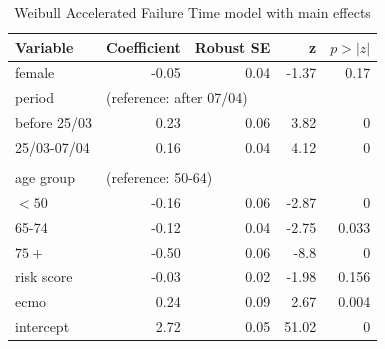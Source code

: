 \documentclass[review]{elsarticle}
\begin{document}
\begin{table}[htbp]
\caption{Weibull Accelerated Failure Time model with main effects \label{Table:main_model_weibull} }
\centering
\begin{tabular}{lrrrr}\toprule
Variable	&	Coefficient	&	Robust SE	&	z	&	$p>|z|$	\\\midrule
     female	&	-0.05	&	0.04	&	-1.37	&	0.17	\\
           									
period	&	\multicolumn{4}{l}{(reference: after 07/04)}							\\
before 25/03	&	0.23	&	0.06	&	3.82	&	0	\\
25/03-07/04	&	0.16	&	0.04	&	4.12	&	0	\\
									\\
age group	&	\multicolumn{4}{l}{(reference: 50-64)}							\\
       $<50$ 	&	-0.16	&	0.06	&	-2.87	&	0	\\
     65-74 	&	-0.12	&	0.04	&	-2.75	&	0.033	\\
       $75+$ 	&	-0.50	&	0.06	&	-8.8	&	0	\\
risk score	&	-0.03	&	0.02	&	-1.98	&	0.156	\\
       ecmo	&	0.24	&	0.09	&	2.67	&	0.004	\\
intercept	&	2.72	&	0.05	&	51.02	&	0	\\\bottomrule
\end{tabular}
 \end{table}
\end{document}

